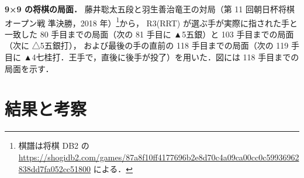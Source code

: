 \documentclass[submit]{ipsj}
\begin{document}
\textbf{9×9 の将棋の局面．}
藤井聡太五段と羽生善治竜王の対局（第 11 回朝日杯将棋オープン戦 準決勝，2018 年）\footnote{棋譜は将棋 DB2 の \url{https://shogidb2.com/games/87a8f10ff4177696b2e8d70c4a09ca00cc0c59936962838dd7fa052cc51800} による．}から，
R3(RRT) が選ぶ手が実際に指された手と一致した 80 手目までの局面（次の 81 手目に ▲5五銀）と 103 手目までの局面（次に △5五銀打），
および最後の手の直前の 118 手目までの局面（次の 119 手目に ▲4七桂打．王手で，直後に後手が投了）を用いた．図には 118 手目までの局面を示す．

\section{結果と考察}
\end{document}
